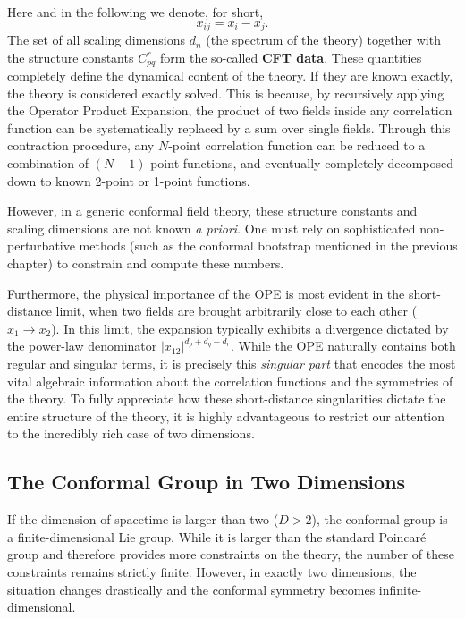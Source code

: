 Here and in the following we denote, for short,
\[
    x_{ij}=x_{i}-x_{j}.
\]
The set of all scaling dimensions \(d_n\) (the spectrum of the theory) together with the structure constants \(C_{pq}^{r}\) form the so-called \textbf{CFT data}. These quantities completely define the dynamical content of the theory. If they are known exactly, the theory is considered exactly solved. This is because, by recursively applying the Operator Product Expansion, the product of two fields inside any correlation function can be systematically replaced by a sum over single fields. Through this contraction procedure, any \(N\)-point correlation function can be reduced to a combination of \((N-1)\)-point functions, and eventually completely decomposed down to known 2-point or 1-point functions.

However, in a generic conformal field theory, these structure constants and scaling dimensions are not known \textit{a priori}. One must rely on sophisticated non-perturbative methods (such as the conformal bootstrap mentioned in the previous chapter) to constrain and compute these numbers.

Furthermore, the physical importance of the OPE is most evident in the short-distance limit, when two fields are brought arbitrarily close to each other (\(x_1 \to x_2\)). In this limit, the expansion typically exhibits a divergence dictated by the power-law denominator \(|x_{12}|^{d_{p}+d_{q}-d_{r}}\). While the OPE naturally contains both regular and singular terms, it is precisely this \textit{singular part} that encodes the most vital algebraic information about the correlation functions and the symmetries of the theory. To fully appreciate how these short-distance singularities dictate the entire structure of the theory, it is highly advantageous to restrict our attention to the incredibly rich case of two dimensions.

\subsection{The Conformal Group in Two Dimensions}

If the dimension of spacetime is larger than two (\(D>2\)), the conformal group is a finite-dimensional Lie group. While it is larger than the standard Poincar\'e group and therefore provides more constraints on the theory, the number of these constraints remains strictly finite. However, in exactly two dimensions, the situation changes drastically and the conformal symmetry becomes infinite-dimensional.


